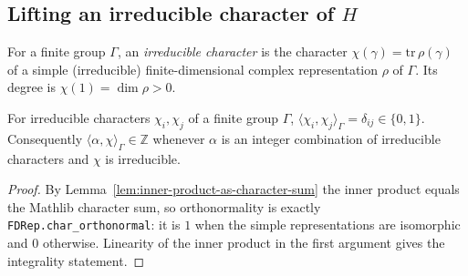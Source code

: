 \subsection{Lifting an irreducible character of $H$}

\begin{definition}
    \label{def:irreducible-character}
    \leanok
    For a finite group $\Gamma$, an \emph{irreducible character} is the character
    $\chi(\gamma) = \mathrm{tr}\,\rho(\gamma)$ of a simple (irreducible)
    finite-dimensional complex representation $\rho$ of $\Gamma$. Its degree is
    $\chi(1) = \dim \rho > 0$.
\end{definition}

\begin{lemma}
    \label{lem:character-inner-product-integer}
    For irreducible characters $\chi_i, \chi_j$ of a finite group $\Gamma$,
    $\langle \chi_i, \chi_j \rangle_\Gamma = \delta_{ij} \in \{0,1\}$. Consequently
    $\langle \alpha, \chi \rangle_\Gamma \in \mathbb{Z}$ whenever $\alpha$ is an
    integer combination of irreducible characters and $\chi$ is irreducible.
\end{lemma}
\begin{proof}
    By Lemma~\ref{lem:inner-product-as-character-sum} the inner product equals the
    Mathlib character sum, so orthonormality is exactly
    \texttt{FDRep.char\_orthonormal}: it is $1$ when the simple representations are
    isomorphic and $0$ otherwise. Linearity of the inner product in the first
    argument gives the integrality statement.
\end{proof}

